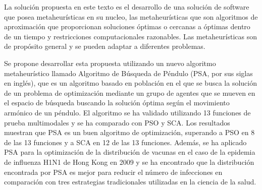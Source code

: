 \documentclass{ieeeaccess}
\begin{document}
La solución propuesta en este texto es el desarrollo de una solución de software que posea metaheurísticas en su nucleo, 
las metaheurísticas que son algoritmos de aproximación que proporcionan soluciones óptimas o cercanas a óptimas dentro de un tiempo y restricciones computacionales razonables. 
Las metaheurísticas son de propósito general y se pueden adaptar a diferentes problemas.

Se propone desarrollar esta propuesta utilizando un nuevo algoritmo metaheurístico llamado Algoritmo de Búsqueda de Péndulo (PSA, por sus siglas en inglés), 
que es un algoritmo basado en población en el que se busca la solución de un problema de optimización mediante un grupo de agentes que se mueven en el espacio de búsqueda 
buscando la solución óptima según el movimiento armónico de un péndulo. El algoritmo se ha validado utilizando 13 funciones de prueba multimodales 
y se ha comparado con PSO y SCA. Los resultados muestran que PSA es un buen algoritmo de optimización, 
superando a PSO en 8 de las 13 funciones y a SCA en 12 de las 13 funciones. 
Además, se ha aplicado PSA para la optimización de la distribución de vacunas en el caso de la epidemia de influenza H1N1 de Hong Kong en 2009 y se ha encontrado 
que la distribución encontrada por PSA es mejor para reducir el número de infecciones en comparación con tres estrategias tradicionales utilizadas en la ciencia de la salud.
\EOD
\end{document}
